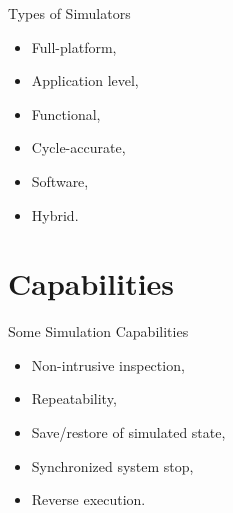 \begin{frame}{Types of Simulators}
\begin{itemize}
\item Full-platform,
\item Application level,
\item Functional,
\item Cycle-accurate,
\item Software,
\item Hybrid.
\end{itemize}
\end{frame}

\section{Capabilities}

\begin{frame}{Some Simulation Capabilities}
\begin{itemize}
\item Non-intrusive inspection,
\item Repeatability,
\item Save/restore of simulated state,
\item Synchronized system stop,
\item Reverse execution.
\end{itemize}
\end{frame}

